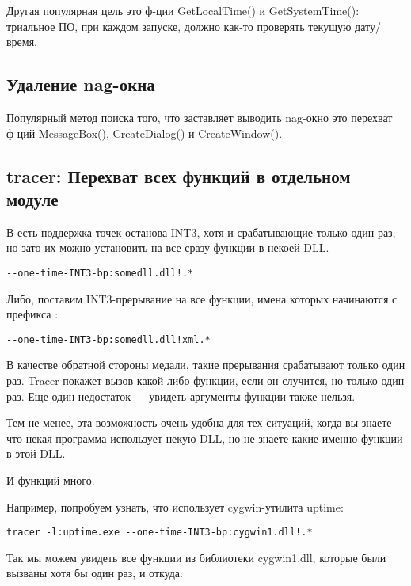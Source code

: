 Другая популярная цель это ф-ции GetLocalTime() и GetSystemTime():
триальное ПО, при каждом запуске, должно как-то проверять текущую дату/время.

\subsection{Удаление nag-окна}

Популярный метод поиска того, что заставляет выводить nag-окно это перехват ф-ций MessageBox(),
CreateDialog() и CreateWindow().

\subsection{tracer: Перехват всех функций в отдельном модуле}

В \tracer есть поддержка точек останова INT3, хотя и срабатывающие только один раз, но зато их можно установить на все
сразу функции в некоей DLL.

\begin{lstlisting}
--one-time-INT3-bp:somedll.dll!.*
\end{lstlisting}

Либо, поставим INT3-прерывание на все функции, имена которых начинаются с префикса :

\begin{lstlisting}
--one-time-INT3-bp:somedll.dll!xml.*
\end{lstlisting}

В качестве обратной стороны медали, такие прерывания срабатывают только один раз.
Tracer покажет вызов какой-либо функции, если он случится, но только один раз.
Еще один недостаток --- увидеть аргументы функции также нельзя.

Тем не менее, эта возможность очень удобна для тех ситуаций, 
когда вы знаете что некая программа использует некую DLL,
но не знаете какие именно функции в этой DLL.

И функций много. 

\par
{}
Например, попробуем узнать, что использует cygwin-утилита uptime:

\begin{lstlisting}
tracer -l:uptime.exe --one-time-INT3-bp:cygwin1.dll!.*
\end{lstlisting}

Так мы можем увидеть все функции из библиотеки cygwin1.dll, которые были вызваны хотя бы один раз, и откуда:



